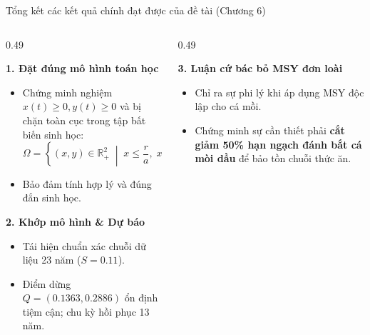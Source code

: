 \documentclass[aspectratio=169, 10pt]{beamer}
\begin{document}
\begin{frame}{Tổng kết các kết quả chính đạt được của đề tài (Chương 6)}
  \begin{columns}[t]
    \begin{column}{0.49\textwidth}
      \begin{block}{\textbf{1. Đặt đúng mô hình toán học}}
        \footnotesize
        \begin{itemize}
          \item Chứng minh nghiệm $x(t) \ge 0, y(t) \ge 0$ và bị chặn toàn cục trong tập bất biến sinh học:
          $$\Omega = \left\{ (x, y) \in \mathbb{R}^2_+ \;\middle|\; x \le \frac{r}{a}, \; x + \frac{y}{\gamma} \le L \right\}$$
          \item Bảo đảm tính hợp lý và đúng đắn sinh học.
        \end{itemize}
      \end{block}

      \vspace{0.1cm}

      \begin{block}{\textbf{2. Khớp mô hình \& Dự báo}}
        \footnotesize
        \begin{itemize}
          \item Tái hiện chuẩn xác chuỗi dữ liệu 23 năm ($S = 0.11$).
          \item Điểm dừng $Q = (0.1363, 0.2886)$ ổn định tiệm cận; chu kỳ hồi phục 13 năm.
        \end{itemize}
      \end{block}
    \end{column}

    \begin{column}{0.49\textwidth}
      \begin{block}{\textbf{3. Luận cứ bác bỏ MSY đơn loài}}
        \footnotesize
        \begin{itemize}
          \item Chỉ ra sự phi lý khi áp dụng MSY độc lập cho cá mồi.
          \item Chứng minh sự cần thiết phải \textbf{cắt giảm 50\% hạn ngạch đánh bắt cá mòi dầu} để bảo tồn chuỗi thức ăn.
        \end{itemize}
      \end{block}


\end{column}
\end{columns}
\end{frame}
\end{document}
